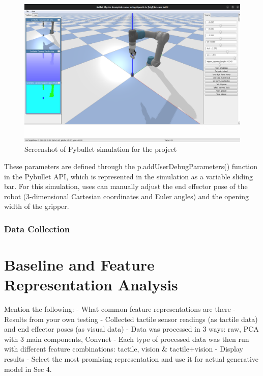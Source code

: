 \documentclass[11pt, a4paper]{report}
\theoremstyle{definition}
\begin{document}
\begin{figure}[H]
    \centering
    \includegraphics[scale=0.25]{docs/Project Report/Media/pybullet_sim.png}
    \caption{Screenshot of Pybullet simulation for the project}
    \label{fig:pbSimScreenshot}
\end{figure}

These parameters are defined through the p.addUserDebugParameters() function in the Pybullet API, which is represented in the simulation as a variable sliding bar. For this simulation, uses can manually adjust the end effector pose of the robot (3-dimensional Cartesian coordinates and Euler angles) and the opening width of the gripper.




\subsection{Data Collection}
\label{sec:3.3.1}



\chapter{Baseline and Feature Representation Analysis}
\label{chap:4}
Mention the following:
- What common feature representations are there
- Results from your own testing
    - Collected tactile sensor readings (as tactile data) and end effector poses (as visual data)
    - Data was processed in 3 ways: raw, PCA with 3 main components, Convnet
    - Each type of processed data was then run with different feature combinations: tactile, vision \& tactile+vision
    - Display results
- Select the most promising representation and use it for actual generative model in Sec 4.
\end{document}
